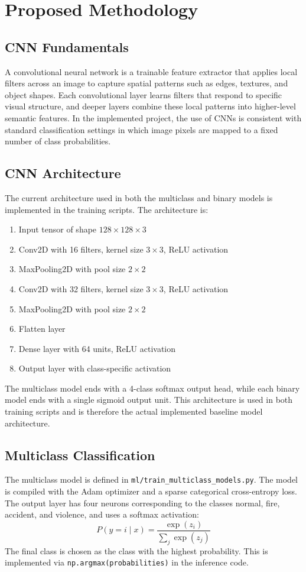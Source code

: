 \documentclass[11pt,a4paper]{article}
\begin{document}
\section{Proposed Methodology}
\subsection{CNN Fundamentals}
A convolutional neural network is a trainable feature extractor that applies local filters across an image to capture spatial patterns such as edges, textures, and object shapes. Each convolutional layer learns filters that respond to specific visual structure, and deeper layers combine these local patterns into higher-level semantic features. In the implemented project, the use of CNNs is consistent with standard classification settings in which image pixels are mapped to a fixed number of class probabilities.

\subsection{CNN Architecture}
The current architecture used in both the multiclass and binary models is implemented in the training scripts. The architecture is:
\begin{enumerate}[leftmargin=1.5em]
    \item Input tensor of shape $128 \times 128 \times 3$
    \item Conv2D with 16 filters, kernel size $3\times3$, ReLU activation
    \item MaxPooling2D with pool size $2\times2$
    \item Conv2D with 32 filters, kernel size $3\times3$, ReLU activation
    \item MaxPooling2D with pool size $2\times2$
    \item Flatten layer
    \item Dense layer with 64 units, ReLU activation
    \item Output layer with class-specific activation
\end{enumerate}
The multiclass model ends with a 4-class softmax output head, while each binary model ends with a single sigmoid output unit. This architecture is used in both training scripts and is therefore the actual implemented baseline model architecture.

\subsection{Multiclass Classification}
The multiclass model is defined in \texttt{ml/train\_multiclass\_models.py}. The model is compiled with the Adam optimizer and a sparse categorical cross-entropy loss. The output layer has four neurons corresponding to the classes normal, fire, accident, and violence, and uses a softmax activation:
\begin{equation}
P(y=i \mid x)=\frac{\exp(z_i)}{\sum_j \exp(z_j)}
\end{equation}
The final class is chosen as the class with the highest probability. This is implemented via \texttt{np.argmax(probabilities)} in the inference code.
\end{document}
